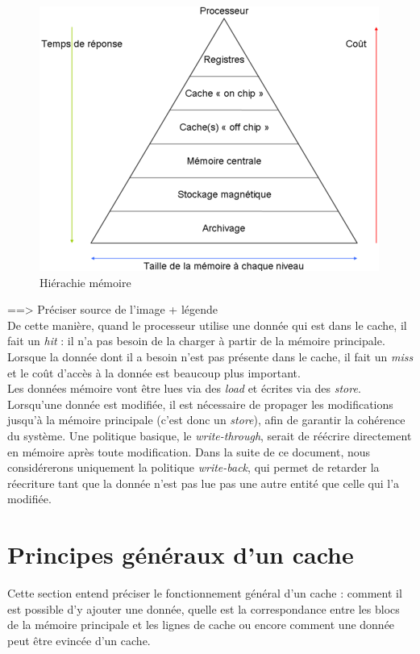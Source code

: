 \begin{figure}[!h]
\begin{center}
   \includegraphics[scale=0.75]{images/hierarchy.png}
   \caption{\label{img:hierarchy} Hiérachie mémoire}
\end{center}
\end{figure}

==> Préciser source de l'image + légende\\

De cette manière, quand le processeur utilise une donnée qui est dans le cache, il fait un \textit{hit} : il n'a pas besoin de la charger à partir de la mémoire principale. Lorsque la donnée dont il a besoin n'est pas présente dans le cache, il fait un \textit{miss} et le coût d'accès à la donnée est beaucoup plus important. \\

Les données mémoire vont être lues via des \textit{load} et écrites via des \textit{store}. Lorsqu'une donnée est modifiée, il est nécessaire de propager les modifications jusqu'à la mémoire principale (c'est donc un \textit{store}), afin de garantir la cohérence du système. Une politique basique, le \textit{write-through}, serait de réécrire directement en mémoire après toute modification. Dans la suite de ce document, nous considérerons uniquement la politique \textit{write-back}, qui permet de retarder la réecriture tant que la donnée n'est pas lue pas une autre entité que celle qui l'a modifiée.

\section{Principes généraux d'un cache}
Cette section entend préciser le fonctionnement général d'un cache : comment il est possible d'y ajouter une donnée, quelle est la correspondance entre les blocs de la mémoire principale et les lignes de cache ou encore comment une donnée peut être evincée d'un cache. \\


